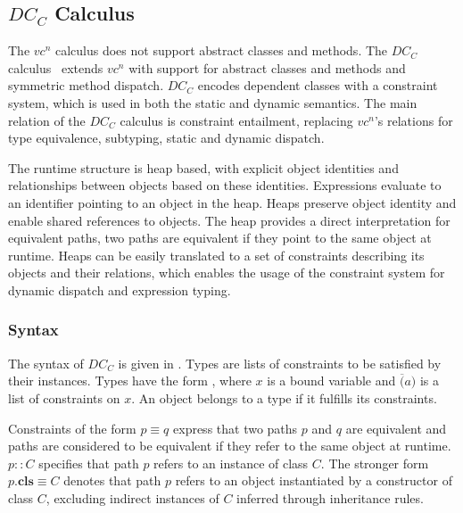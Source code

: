 \subsection{$DC_C$ Calculus}
\label{sec:dcc}
The $vc^n$ calculus does not support abstract classes and methods.
The $DC_C$ calculus~\cite{vaidas:thesis} extends $vc^n$ with support for abstract classes and methods
and symmetric method dispatch.
$DC_C$ encodes dependent classes with a constraint system,
which is used in both the static and dynamic semantics.
The main relation of the $DC_C$ calculus is constraint entailment,
replacing $vc^n$'s relations for type equivalence, subtyping, static and dynamic dispatch.

The runtime structure is heap based,
with explicit object identities
and relationships between objects based on these identities.
Expressions evaluate to an identifier pointing to an object in the heap.
Heaps preserve object identity and enable shared references to objects.
The heap provides a direct interpretation for equivalent paths,
two paths are equivalent if they point to the same object at runtime.
Heaps can be easily translated to a set of constraints describing its objects and their relations,
which enables the usage of the constraint system for dynamic dispatch and expression typing.
\subsubsection{Syntax}
The syntax of $DC_C$ is given in .
Types are lists of constraints to be satisfied by their instances.
Types have the form , where $x$ is a bound variable
and $\overline(a)$ is a list of constraints on $x$.
An object belongs to a type if it fulfills its constraints.

Constraints of the form $p \equiv q$ express that two paths $p$ and $q$ are equivalent
and paths are considered to be equivalent if they refer to the same object at runtime.
$p :: C$ specifies that path $p$ refers to an instance of class $C$.
The stronger form $p.\textbf{cls} \equiv C$ denotes that
path $p$ refers to an object instantiated by a constructor of class $C$,
excluding indirect instances of $C$ inferred through inheritance rules.

